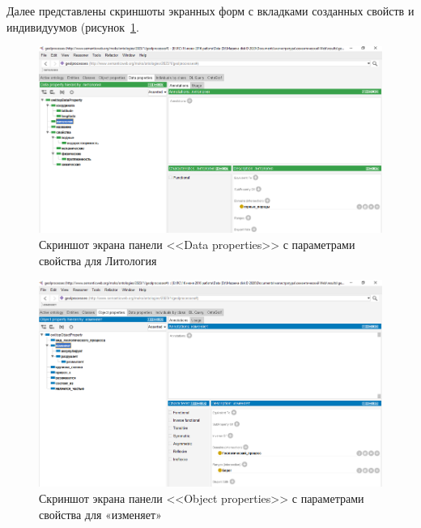 \documentclass[732,14pt,final]{studrep}
\begin{document}
Далее представлены скриншоты экранных форм с вкладками созданных свойств и индивидуумов (рисунок~\ref{fig:data-props}.

\begin{center}
  \begin{figure}[htp]
	\centering
	\includegraphics[width=0.9\linewidth]{pics/image24.png}
    \caption{Скриншот экрана панели <<Data properties>> с параметрами свойства для Литология}
    \label{fig:data-props}
  \end{figure}
\end{center}

\begin{center}
  \begin{figure}[htp]
	\centering
	\includegraphics[width=0.9\linewidth]{pics/image10.png}
    \caption{Скриншот экрана панели <<Object properties>> с параметрами свойства для «изменяет»}
    \label{fig:obj-props}
  \end{figure}
\end{center}
\end{document}
